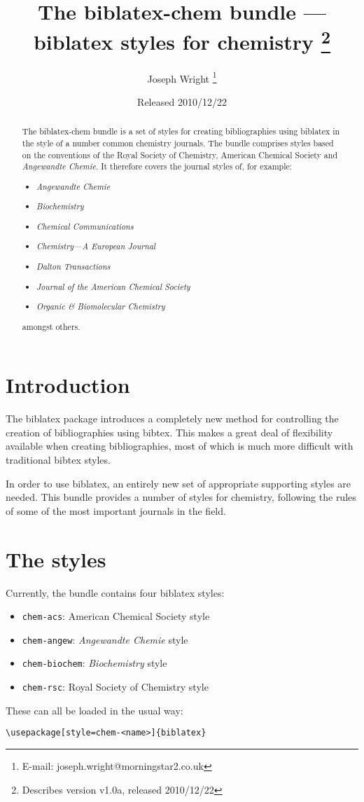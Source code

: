 \documentclass[a4paper]{article}
\title{The \textsf{biblatex-chem} bundle --- 
  \textsf{biblatex} styles for chemistry%
  \thanks{Describes version v1.0a, released 2010/12/22}}
\author{Joseph Wright%
  \thanks{E-mail: joseph.wright@morningstar2.co.uk}}
\date{Released 2010/12/22}
\begin{document}
\maketitle
\begin{abstract}
The \textsf{biblatex-chem} bundle is a set of styles for 
creating bibliographies using \textsf{biblatex} in the style of
a number common chemistry journals.  The bundle comprises styles
based on the conventions of the Royal Society of Chemistry, 
American Chemical Society and 	\emph{Angewandte Chemie}. It
therefore covers the journal styles of, for example:
\begin{itemize}
  \item \emph{Angewandte Chemie}
  \item \emph{Biochemistry}
  \item \emph{Chemical Communications}
  \item \emph{Chemistry---A European Journal}
  \item \emph{Dalton Transactions}
  \item \emph{Journal of the American Chemical Society}
  \item \emph{Organic \& Biomolecular Chemistry}
\end{itemize}
amongst others.
\end{abstract}

\begin{multicols}{2}
  \tableofcontents
\end{multicols}

\section{Introduction}
The \textsf{biblatex} package introduces a completely new method
for controlling the creation of bibliographies using
\textsf{bibtex}. This makes a great deal of flexibility 
available when creating bibliographies, most of which is much 
more difficult with traditional \textsf{bibtex} styles.

In order to use \textsf{biblatex}, an entirely new set of 
appropriate supporting styles are needed. This bundle provides a
number of styles for chemistry, following the rules of some of 
the most important journals in the field. 

\section{The styles}

Currently, the bundle contains four \textsf{biblatex} styles:
\begin{itemize}
  \item \texttt{chem-acs}: American Chemical Society style
  \item \texttt{chem-angew}: \emph{Angewandte Chemie} style
  \item \texttt{chem-biochem}: \emph{Biochemistry} style
  \item \texttt{chem-rsc}: Royal Society of Chemistry style
\end{itemize}
These can all be loaded in the usual way:
\begin{verbatim}
\usepackage[style=chem-<name>]{biblatex}
\end{verbatim}
\end{document}
